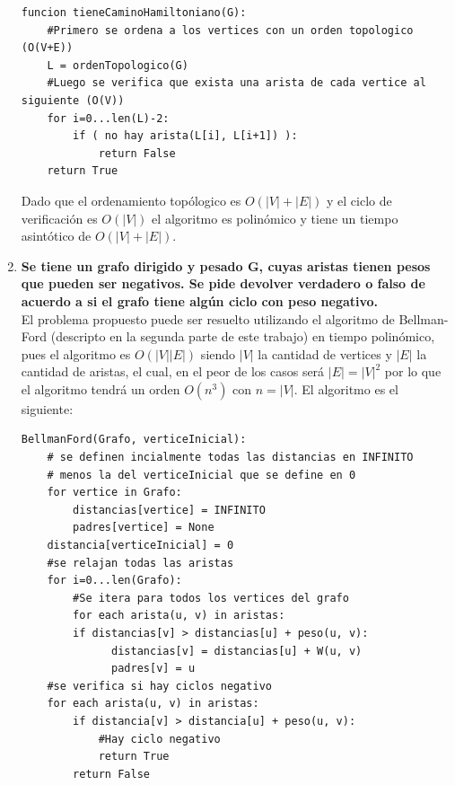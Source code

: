 \documentclass{article}
\newcommand\tab[1][0.5cm]{\hspace*{#1}}
\begin{document}
\begin{enumerate}
\begin{lstlisting}
funcion tieneCaminoHamiltoniano(G):
    #Primero se ordena a los vertices con un orden topologico (O(V+E))
    L = ordenTopologico(G)
    #Luego se verifica que exista una arista de cada vertice al siguiente (O(V))
    for i=0...len(L)-2:
        if ( no hay arista(L[i], L[i+1]) ):
            return False
    return True
            \end{lstlisting}
            \tab Dado que el ordenamiento topólogico es $O(|V| + |E|)$ y el ciclo de verificación es $O(|V|)$
            el algoritmo es polinómico y tiene un tiempo asintótico de $O(|V|+|E|)$.


        \item \textbf{Se tiene un grafo dirigido y pesado G, cuyas aristas tienen pesos que pueden ser negativos. Se pide
            devolver verdadero o falso de acuerdo a si el grafo tiene algún ciclo con peso negativo.} \\
            \tab El problema propuesto puede ser resuelto utilizando el algoritmo de Bellman-Ford (descripto en la segunda
            parte de este trabajo) en tiempo polinómico, pues el algoritmo es $O(|V||E|)$ siendo $|V|$ la cantidad de
            vertices y $|E|$ la cantidad de aristas, el cual, en el peor de los casos será $|E|=|V|^2$ por lo que
            el algoritmo tendrá un orden $O(n^3)$ con $n = |V|$. El algoritmo es el siguiente:
            \begin{lstlisting}
BellmanFord(Grafo, verticeInicial):
    # se definen incialmente todas las distancias en INFINITO
    # menos la del verticeInicial que se define en 0
    for vertice in Grafo:
        distancias[vertice] = INFINITO
        padres[vertice] = None
    distancia[verticeInicial] = 0
    #se relajan todas las aristas
    for i=0...len(Grafo):
        #Se itera para todos los vertices del grafo
        for each arista(u, v) in aristas:
        if distancias[v] > distancias[u] + peso(u, v):
              distancias[v] = distancias[u] + W(u, v)
              padres[v] = u
    #se verifica si hay ciclos negativo
    for each arista(u, v) in aristas:
        if distancia[v] > distancia[u] + peso(u, v):
            #Hay ciclo negativo
            return True
        return False
            \end{lstlisting}


\end{enumerate}
\end{document}
